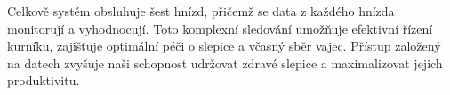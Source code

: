 Celkově systém obsluhuje šest hnízd, přičemž se data z každého hnízda monitorují a vyhodnocují.
Toto komplexní sledování umožňuje efektivní řízení kurníku, zajišťuje optimální péči o slepice a včasný sběr vajec.
Přístup založený na datech zvyšuje naši schopnost udržovat zdravé slepice a maximalizovat jejich produktivitu.

%
%
%

